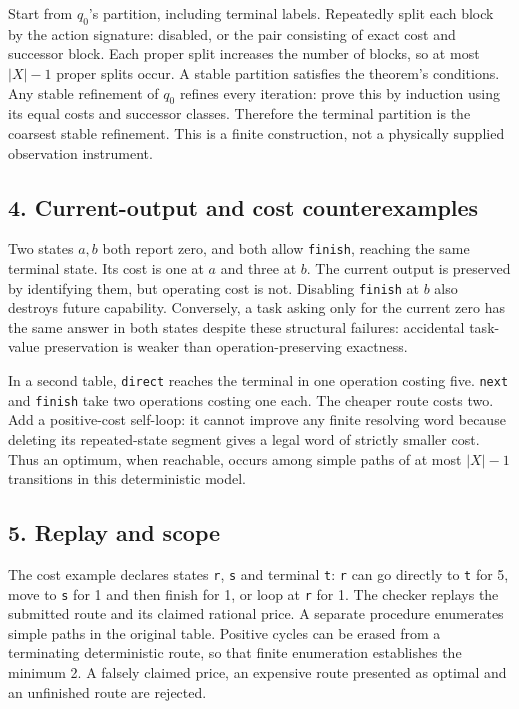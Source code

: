 \documentclass[
  11pt,
]{article}
\newcommand{\passthrough}[1]{#1}
\begin{document}
Start from \(q_0\)'s partition, including terminal labels. Repeatedly
split each block by the action signature: disabled, or the pair
consisting of exact cost and successor block. Each proper split
increases the number of blocks, so at most \(|X|-1\) proper splits
occur. A stable partition satisfies the theorem's conditions. Any stable
refinement of \(q_0\) refines every iteration: prove this by induction
using its equal costs and successor classes. Therefore the terminal
partition is the coarsest stable refinement. This is a finite
construction, not a physically supplied observation instrument.

\subsection{4. Current-output and cost
counterexamples}\label{current-output-and-cost-counterexamples}

Two states \(a,\allowbreak b\) both report zero, and both allow
\passthrough{\lstinline!finish!}, reaching the same terminal state. Its
cost is one at \(a\) and three at \(b\). The current output is preserved
by identifying them, but operating cost is not. Disabling
\passthrough{\lstinline!finish!} at \(b\) also destroys future
capability. Conversely, a task asking only for the current zero has the
same answer in both states despite these structural failures: accidental
task-value preservation is weaker than operation-preserving exactness.

In a second table, \passthrough{\lstinline!direct!} reaches the terminal
in one operation costing five. \passthrough{\lstinline!next!} and
\passthrough{\lstinline!finish!} take two operations costing one each.
The cheaper route costs two. Add a positive-cost self-loop: it cannot
improve any finite resolving word because deleting its repeated-state
segment gives a legal word of strictly smaller cost. Thus an optimum,
when reachable, occurs among simple paths of at most \(|X|-1\)
transitions in this deterministic model.

\subsection{5. Replay and scope}\label{replay-and-scope}

The cost example declares states \passthrough{\lstinline!r!},
\passthrough{\lstinline!s!} and terminal \passthrough{\lstinline!t!}:
\passthrough{\lstinline!r!} can go directly to
\passthrough{\lstinline!t!} for 5, move to \passthrough{\lstinline!s!}
for 1 and then finish for 1, or loop at \passthrough{\lstinline!r!} for
1. The checker replays the submitted route and its claimed rational
price. A separate procedure enumerates simple paths in the original
table. Positive cycles can be erased from a terminating deterministic
route, so that finite enumeration establishes the minimum 2. A falsely
claimed price, an expensive route presented as optimal and an unfinished
route are rejected.
\end{document}
